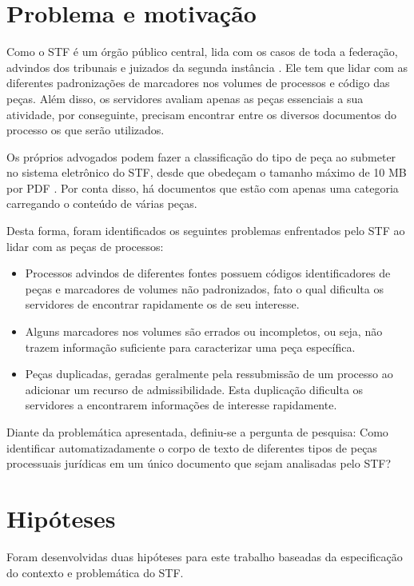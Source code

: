 \section{Problema e motivação}

Como o STF é um órgão público central, lida com os casos de toda a federação, advindos dos tribunais e juizados da segunda instância \cite{BRASIL1988}. Ele tem que lidar com as diferentes padronizações de marcadores nos volumes de processos e código das peças. Além disso, os servidores avaliam apenas as peças essenciais a sua atividade, por conseguinte, precisam encontrar entre os diversos documentos do processo os que serão utilizados.

Os próprios advogados podem fazer a classificação do tipo de peça ao submeter no sistema eletrônico do STF, desde que obedeçam o tamanho máximo de 10 MB por PDF \cite{STF2010}. Por conta disso, há documentos que estão com apenas uma categoria carregando o conteúdo de várias peças.

Desta forma, foram identificados os seguintes problemas enfrentados pelo STF ao lidar com as peças de processos:

\begin{itemize}
	\item Processos advindos de diferentes fontes possuem códigos identificadores de peças e marcadores de volumes não padronizados, fato o qual dificulta os servidores de encontrar rapidamente os de seu interesse.
    \item Alguns marcadores nos volumes são errados ou incompletos, ou seja, não trazem informação suficiente para caracterizar uma peça específica.
    \item Peças duplicadas, geradas geralmente pela ressubmissão de um processo ao adicionar um recurso de admissibilidade. Esta duplicação dificulta os servidores a encontrarem informações de interesse rapidamente.
\end{itemize}

Diante da problemática apresentada, definiu-se a pergunta de pesquisa: Como identificar automatizadamente o corpo de texto de diferentes tipos de peças processuais jurídicas em um único documento que sejam analisadas pelo STF?

\section{Hipóteses}

Foram desenvolvidas duas hipóteses \cite{GIL2002} para este trabalho baseadas da especificação do contexto e problemática do STF. 

